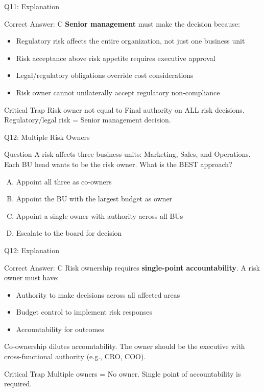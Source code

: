 \documentclass{beamer}
\begin{document}
	\begin{frame}{Q11: Explanation}
		\begin{block}{Correct Answer: C}
			\textbf{Senior management} must make the decision because:
			\begin{itemize}
				\item Regulatory risk affects the entire organization, not just one business unit
				\item Risk acceptance above risk appetite requires executive approval
				\item Legal/regulatory obligations override cost considerations
				\item Risk owner cannot unilaterally accept regulatory non-compliance
			\end{itemize}
		\end{block}
		\begin{alertblock}{Critical Trap}
			Risk owner not equal to Final authority on ALL risk decisions.
			Regulatory/legal risk = Senior management decision.
		\end{alertblock}
	\end{frame}
	
	\begin{frame}{Q12: Multiple Risk Owners}
		\begin{block}{Question}
			A risk affects three business units: Marketing, Sales, and Operations. Each BU head wants to be the risk owner. What is the BEST approach?
		\end{block}
		\begin{enumerate}[(A)]
			\item Appoint all three as co-owners
			\item Appoint the BU with the largest budget as owner
			\item Appoint a single owner with authority across all BUs
			\item Escalate to the board for decision
		\end{enumerate}
	\end{frame}
	
	\begin{frame}{Q12: Explanation}
		\begin{block}{Correct Answer: C}
			Risk ownership requires \textbf{single-point accountability}. A risk owner must have:
			\begin{itemize}
				\item Authority to make decisions across all affected areas
				\item Budget control to implement risk responses
				\item Accountability for outcomes
			\end{itemize}
			Co-ownership dilutes accountability. The owner should be the executive with cross-functional authority (e.g., CRO, COO).
		\end{block}
		\begin{alertblock}{Critical Trap}
			Multiple owners = No owner.
			Single point of accountability is required.
		\end{alertblock}
	\end{frame}
	
\end{document}
